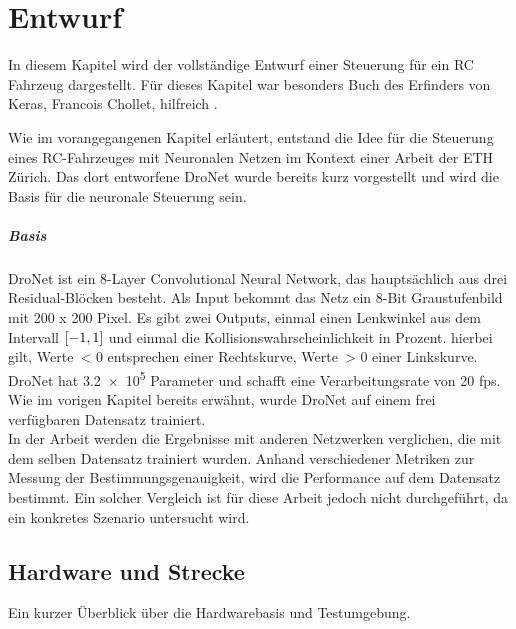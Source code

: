 %
\chapter{Entwurf}
In diesem Kapitel wird der vollständige Entwurf einer Steuerung für ein RC Fahrzeug dargestellt.
Für dieses Kapitel war besonders Buch des Erfinders von Keras, Francois Chollet, hilfreich \cite{chollet2018deep}.

Wie im vorangegangenen Kapitel erläutert, entstand die Idee für die Steuerung eines RC-Fahrzeuges mit Neuronalen Netzen im Kontext einer Arbeit der ETH Zürich.
Das dort entworfene DroNet wurde bereits kurz vorgestellt und wird die Basis für die neuronale Steuerung sein. 

\paragraph{Basis}
DroNet ist ein 8-Layer Convolutional Neural Network, das hauptsächlich aus drei Residual-Blöcken besteht. Als Input bekommt das Netz ein 8-Bit Graustufenbild mit 200 x 200 Pixel. Es gibt zwei Outputs, einmal einen Lenkwinkel aus dem Intervall $\interval{-1}{1}$ und einmal die Kollisionswahrscheinlichkeit in Prozent. hierbei gilt, Werte~< 0 entsprechen einer Rechtskurve, Werte~> 0 einer Linkskurve.
DroNet hat \num{3.2e5} Parameter und schafft eine Verarbeitungsrate von 20 fps.
Wie im vorigen Kapitel bereits erwähnt, wurde DroNet auf einem frei verfügbaren Datensatz trainiert.\\
In der Arbeit werden die Ergebnisse mit anderen Netzwerken verglichen, die mit dem selben Datensatz trainiert wurden. Anhand verschiedener Metriken zur Messung der Bestimmungsgenauigkeit, wird die Performance auf dem Datensatz bestimmt. Ein solcher Vergleich ist für diese Arbeit jedoch nicht durchgeführt, da ein konkretes Szenario untersucht wird.
\newpage 

\section{Hardware und Strecke}
Ein kurzer Überblick über die Hardwarebasis und Testumgebung.

